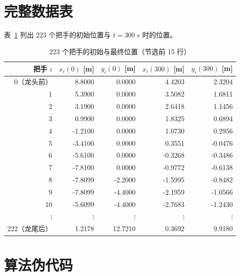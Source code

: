 
\appendix
\section{完整数据表}\label{app:data}

表~\ref{tab:full_data} 列出 223 个把手的初始位置与 $t=300$ s 时的位置。

\begin{table}[htbp]
\centering
\caption{223 个把手的初始与最终位置（节选前 15 行）}\label{tab:full_data}
\begin{tabular}{r rr rr}
\toprule
把手 $i$ & $x_i(0)$ [m] & $y_i(0)$ [m] & $x_i(300)$ [m] & $y_i(300)$ [m] \\
\midrule
0（龙头前） & 8.8000 & 0.0000 & 4.4203 & 2.3204 \\
1 & 5.3900 & 0.0000 & 3.5082 & 1.6811 \\
2 & 3.1900 & 0.0000 & 2.6418 & 1.1456 \\
3 & 0.9900 & 0.0000 & 1.8325 & 0.6894 \\
4 & -1.2100 & 0.0000 & 1.0730 & 0.2956 \\
5 & -3.4100 & 0.0000 & 0.3551 & -0.0476 \\
6 & -5.6100 & 0.0000 & -0.3268 & -0.3486 \\
7 & -7.8100 & 0.0000 & -0.9772 & -0.6138 \\
8 & -7.8099 & -2.2000 & -1.5995 & -0.8482 \\
9 & -7.8099 & -4.4000 & -2.1959 & -1.0566 \\
10 & -5.6099 & -4.4000 & -2.7683 & -1.2430 \\
$\vdots$ & $\vdots$ & $\vdots$ & $\vdots$ & $\vdots$ \\
222（龙尾后） & 1.2178 & 12.7210 & 0.3692 & 9.9180 \\
\bottomrule
\end{tabular}
\end{table}

\section{算法伪代码}\label{app:alg}

